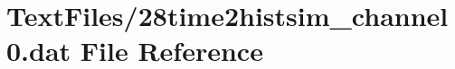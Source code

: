\hypertarget{28time2histsim__channel0_8dat}{}\section{Text\+Files/28time2histsim\+\_\+channel0.dat File Reference}
\label{28time2histsim__channel0_8dat}
